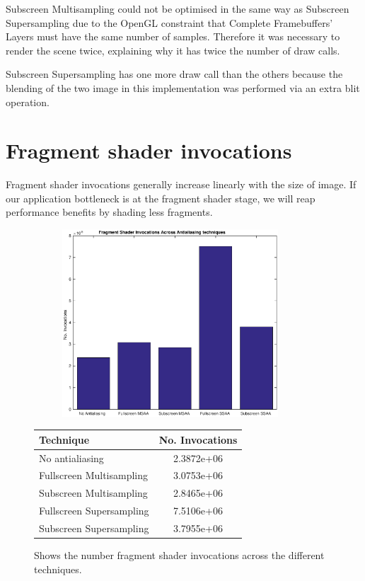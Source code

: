 \documentclass[12pt,a4paper,twoside,openright]{report}
\begin{document}
Subscreen Multisampling could not be optimised in the same way as Subscreen Supersampling due to the OpenGL constraint that Complete Framebuffers' Layers must have the same number of samples. Therefore it was necessary to render the scene twice, explaining why it has twice the number of draw calls.

Subscreen Supersampling has one more draw call than the others because the blending of the two image in this implementation was performed via an extra blit operation.

\section{Fragment shader invocations}

Fragment shader invocations generally increase linearly with the size of image. If our application bottleneck is at the fragment shader stage, we will reap performance benefits by shading less fragments.

\begin{figure}[tbh]

 
\begin{subfigure}{0.5\textwidth}
\includegraphics[height=7cm]{figs/fsInvocations.eps}
\end{subfigure}
\qquad
\begin{tabular}{l|c}
Technique   & No. Invocations \\ 
\hline
No antialiasing      & 2.3872e+06 \\
Fullscreen Multisampling     & 3.0753e+06 \\
Subscreen Multisampling    &  2.8465e+06  \\
Fullscreen Supersampling      &  7.5106e+06   \\
Subscreen Supersampling    &  3.7955e+06  \\
\end{tabular}
 
\caption{Shows the number fragment shader invocations across the different techniques.}
\end{figure}
\end{document}
